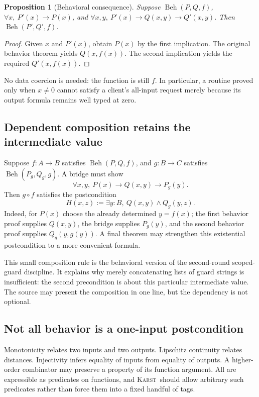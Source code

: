 \documentclass[11pt,letterpaper]{article}
\newcommand{\Karst}{\textsc{Karst}}
\newtheorem{proposition}[definition]{Proposition}
\theoremstyle{remark}
\begin{document}
\begin{proposition}[Behavioral consequence]\label{prop:consequence}
Suppose $\operatorname{Beh}(P,Q,f)$,
$\forall x,\ P'(x)\to P(x)$, and
$\forall x,y,\ P'(x)\to Q(x,y)\to Q'(x,y)$.
Then $\operatorname{Beh}(P',Q',f)$.
\end{proposition}
\begin{proof}
Given $x$ and $P'(x)$, obtain $P(x)$ by the first implication. The original
behavior theorem yields $Q(x,f(x))$. The second implication yields the required
$Q'(x,f(x))$.
\end{proof}

No data coercion is needed: the function is still $f$. In particular, a routine
proved only when $x\ne0$ cannot satisfy a client's all-input request merely
because its output formula remains well typed at zero.

\subsection{Dependent composition retains the intermediate value}
Suppose $f:A\to B$ satisfies $\operatorname{Beh}(P,Q,f)$, and
$g:B\to C$ satisfies $\operatorname{Beh}(P_g,Q_g,g)$. A bridge must show
\[
 \forall x,y,\ P(x)\to Q(x,y)\to P_g(y).
\]
Then $g\circ f$ satisfies the postcondition
\[
  H(x,z):=\exists y:B,\ Q(x,y)\land Q_g(y,z).
\]
Indeed, for $P(x)$ choose the already determined $y=f(x)$; the first behavior
proof supplies $Q(x,y)$, the bridge supplies $P_g(y)$, and the second behavior
proof supplies $Q_g(y,g(y))$. A final theorem may strengthen this existential
postcondition to a more convenient formula.

This small composition rule is the behavioral version of the second-round
scoped-guard discipline. It explains why merely concatenating lists of guard
strings is insufficient: the second precondition is about this particular
intermediate value. The source may present the composition in one line, but
the dependency is not optional.

\subsection{Not all behavior is a one-input postcondition}
Monotonicity relates two inputs and two outputs. Lipschitz continuity relates
distances. Injectivity infers equality of inputs from equality of outputs.
A higher-order combinator may preserve a property of its function argument.
All are expressible as predicates on functions, and \Karst\ should allow
arbitrary such predicates rather than force them into a fixed handful of tags.
\end{document}
